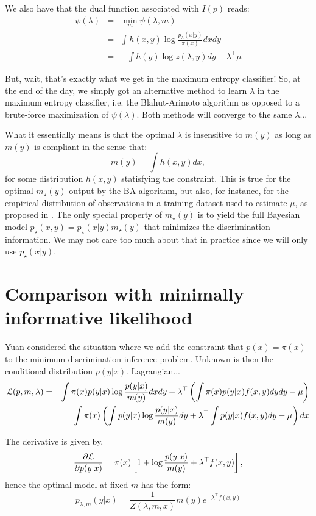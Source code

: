 \documentclass[english]{scrartcl}
\begin{document}
We also have that the dual function associated with $I(p)$ reads:
\begin{eqnarray*}
\psi(\lambda) 
 & = & \min_m \psi(\lambda, m)\\
 & = & \int h(x,y) \log \frac{p_{\lambda}(x|y)}{\pi(x)} dxdy\\
 & = & -\int h(y) \log z(\lambda,y) dy - \lambda^\top \mu
\end{eqnarray*}

But, wait, that's exactly what we get in the maximum entropy
classifier! So, at the end of the day, we simply got an alternative
method to learn $\lambda$ in the maximum entropy classifier, i.e. the
Blahut-Arimoto algorithm as opposed to a brute-force maximization of
$\psi(\lambda)$. Both methods will converge to the same $\lambda$...

What it essentially means is that the optimal $\lambda$ is insensitive
to $m(y)$ as long as $m(y)$ is compliant in the sense that:
$$
m(y) = \int h(x,y) dx,
$$ for some distribution $h(x,y)$ statisfying the constraint. This is
true for the optimal $m_\star(y)$ output by the BA algorithm, but
also, for instance, for the empirical distribution of observations in
a training dataset used to estimate $\mu$, as proposed in
\cite{BergerA-96}. The only special property of $m_\star(y)$ is to
yield the full Bayesian model $p_\star(x,y)=p_\star(x|y)m_\star(y)$
that minimizes the discrimination information. We may not care too
much about that in practice since we will only use $p_\star(x|y)$. 

\section{Comparison with minimally informative likelihood}

Yuan \cite{Yuan-99} considered the situation where we add the
constraint that $p(x)=\pi(x)$ to the minimum discrimination inference
problem. Unknown is then the conditional distribution
$p(y|x)$. Lagrangian...
\begin{eqnarray*}
{\cal L}(p,m,\lambda)
 & = & 
\int \pi(x)p(y|x) \log \frac{p(y|x)}{m(y)} dxdy
+
\lambda^\top \left( 
\int \pi(x)p(y|x) f(x,y) dydy - \mu 
\right) \\
 & = & 
\int \pi(x)
\left( 
\int
p(y|x) \log \frac{p(y|x)}{m(y)} dy
+
\lambda^\top 
\int p(y|x) f(x,y) dy
- \mu 
\right)
dx 
\end{eqnarray*}

The derivative is given by,
$$
\frac{\partial\cal L}{\partial p(y|x)}
= 
\pi(x)\left[ 
1 + \log \frac{p(y|x)}{m(y)} 
+ \lambda^\top f(x,y)
\right],
$$
hence the optimal model at fixed $m$ has the form:
$$
p_{\lambda,m}(y|x) = \frac{1}{Z(\lambda,m,x)} m(y) e^{-\lambda^\top f(x,y)} 
$$
\end{document}
